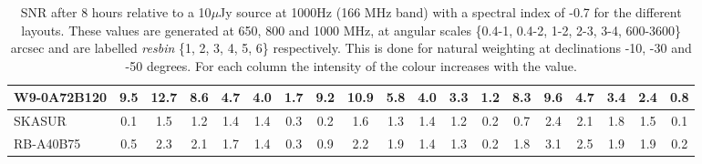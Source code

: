 \begin{table}[!htp]
{{\begin{tabular}{|lcccccc||cccccc||cccccc|}
W9-0A72B120 & 9.5 \cellcolor{blue!58.53} & 12.7 \cellcolor{red!57.55} & 8.6 \cellcolor{green!56.72} & 4.7 \cellcolor{orange!53.00} & 4.0 \cellcolor{purple!54.08} & 1.7 \cellcolor{blue!55.13} & 9.2 \cellcolor{blue!57.54} & 10.9 \cellcolor{red!56.53} & 5.8 \cellcolor{green!53.51} & 4.0 \cellcolor{orange!51.97} & 3.3 \cellcolor{purple!54.95} & 1.2 \cellcolor{blue!56.86} & 8.3 \cellcolor{blue!57.62} & 9.6 \cellcolor{red!56.19} & 4.7 \cellcolor{green!52.74} & 3.4 \cellcolor{orange!52.50} & 2.4 \cellcolor{purple!42.55} & 0.8 \cellcolor{blue!57.53}\\ \hline 
SKASUR & 0.1 \cellcolor{blue!18.00} & 1.5 \cellcolor{red!18.00} & 1.2 \cellcolor{green!18.00} & 1.4 \cellcolor{orange!18.00} & 1.4 \cellcolor{purple!18.00} & 0.3 \cellcolor{blue!18.00} & 0.2 \cellcolor{blue!18.00} & 1.6 \cellcolor{red!18.00} & 1.3 \cellcolor{green!18.00} & 1.4 \cellcolor{orange!18.00} & 1.2 \cellcolor{purple!18.00} & 0.2 \cellcolor{blue!18.00} & 0.7 \cellcolor{blue!18.00} & 2.4 \cellcolor{red!18.00} & 2.1 \cellcolor{green!18.00} & 1.8 \cellcolor{orange!18.00} & 1.5 \cellcolor{purple!18.00} & 0.1 \cellcolor{blue!18.00}\\ \hline 
RB-A40B75 & 0.5 \cellcolor{blue!19.60} & 2.3 \cellcolor{red!20.85} & 2.1 \cellcolor{green!22.38} & 1.7 \cellcolor{orange!20.37} & 1.4 \cellcolor{purple!18.96} & 0.3 \cellcolor{blue!18.77} & 0.9 \cellcolor{blue!21.29} & 2.2 \cellcolor{red!20.52} & 1.9 \cellcolor{green!22.82} & 1.4 \cellcolor{orange!18.39} & 1.3 \cellcolor{purple!19.05} & 0.2 \cellcolor{blue!18.79} & 1.8 \cellcolor{blue!23.63} & 3.1 \cellcolor{red!21.60} & 2.5 \cellcolor{green!23.02} & 1.9 \cellcolor{orange!20.14} & 1.9 \cellcolor{purple!28.91} & 0.2 \cellcolor{blue!19.85}\tabularnewline \hline 
\end{tabular}}\hfill 

\caption{SNR after 8 hours relative to a 10$\mu$Jy source at 1000Hz (166 MHz band) with a spectral  index of -0.7 for the different layouts. These values are generated at 650, 800 and 1000 MHz, at angular scales \{0.4-1, 0.4-2, 1-2, 2-3, 3-4, 600-3600\} arcsec and are labelled {\it resbin} \{1, 2, 3, 4, 5, 6\} respectively. This is done for natural weighting at declinations -10, -30 and -50 degrees. For each column the intensity of the colour increases with the value.}\label{tab:snr10-new}}
 \end{table}